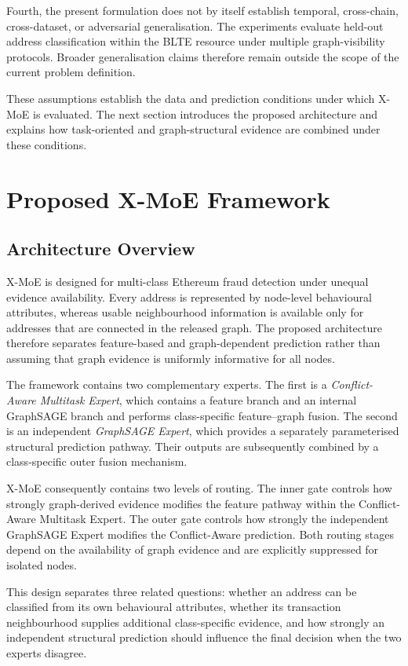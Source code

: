 \documentclass{ieeeaccess}
\begin{document}
Fourth, the present formulation does not by itself establish temporal, cross-chain, cross-dataset, or adversarial generalisation. The experiments evaluate held-out address classification within the BLTE resource under multiple graph-visibility protocols. Broader generalisation claims therefore remain outside the scope of the current problem definition.

These assumptions establish the data and prediction conditions under which X-MoE is evaluated. The next section introduces the proposed architecture and explains how task-oriented and graph-structural evidence are combined under these conditions.

\section{Proposed X-MoE Framework}

\subsection{Architecture Overview}

X-MoE is designed for multi-class Ethereum fraud detection under unequal evidence availability. Every address is represented by node-level behavioural attributes, whereas usable neighbourhood information is available only for addresses that are connected in the released graph. The proposed architecture therefore separates feature-based and graph-dependent prediction rather than assuming that graph evidence is uniformly informative for all nodes.

The framework contains two complementary experts. The first is a \textit{Conflict-Aware Multitask Expert}, which contains a feature branch and an internal GraphSAGE branch and performs class-specific feature--graph fusion. The second is an independent \textit{GraphSAGE Expert}, which provides a separately parameterised structural prediction pathway. Their outputs are subsequently combined by a class-specific outer fusion mechanism.

X-MoE consequently contains two levels of routing. The inner gate controls how strongly graph-derived evidence modifies the feature pathway within the Conflict-Aware Multitask Expert. The outer gate controls how strongly the independent GraphSAGE Expert modifies the Conflict-Aware prediction. Both routing stages depend on the availability of graph evidence and are explicitly suppressed for isolated nodes.

This design separates three related questions: whether an address can be classified from its own behavioural attributes, whether its transaction neighbourhood supplies additional class-specific evidence, and how strongly an independent structural prediction should influence the final decision when the two experts disagree.
\end{document}
